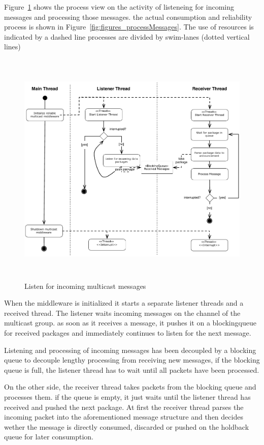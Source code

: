 Figure~\ref{fig:figures_processReceivePackage} shows the process view on the activity of listeneing for incoming messages and processing those messages. the actual consumption and reliability process is shown in Figure~\ref{fig:figures_processMessages}.
The use of resources  is indicated by a dashed line 
processes are divided by swim-lanes (dotted vertical lines)
\begin{figure}[htbp]
    \centering
        \includegraphics[height=4.5in]{figures/receivePackets.pdf}
    \caption{Listen for incoming multicast messages}
    \label{fig:figures_processReceivePackage}
\end{figure}
When the middleware is initialized it starts a separate listener threads and a received thread. The listener waits incoming messages on the channel of the multicast group. as soon as it receives a message, it pushes it on a blockingqueue for received packages and immediately continues to listen for the next message. 

Listening and processing of incoming messages has been decoupled by a blocking queue to decouple lengthy processing from receiving new messages, if the blocking queue is full, the listener thread has to wait until all packets have been processed. 

On the other side, the receiver thread takes packets from the blocking queue and processes them. if the queue is empty, it just waits until the listener thread has received and pushed the next package. 
At first the receiver thread parses the incoming packet into the aforementioned message structure and then decides wether the message is directly consumed, discarded or pushed on the holdback queue for later consumption.

